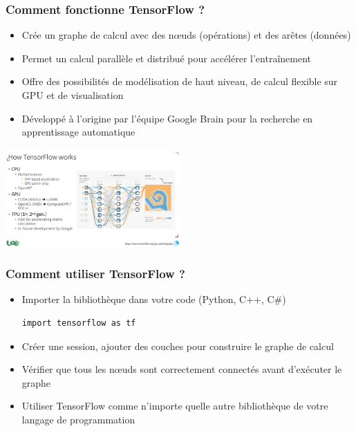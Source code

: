 \documentclass{beamer}
\begin{document}
	\begin{frame}
		\frametitle{Comment fonctionne TensorFlow ?}
		\begin{itemize}
			\item Crée un graphe de calcul avec des nœuds (opérations) et des arêtes (données)
			\item Permet un calcul parallèle et distribué pour accélérer l'entraînement
			\item Offre des possibilités de modélisation de haut niveau, de calcul flexible sur GPU et de visualisation
			\item Développé à l'origine par l'équipe Google Brain pour la recherche en apprentissage automatique
		\end{itemize}

			\centering
	\includegraphics[width=0.5\textwidth]{Tensorflow work.jpeg}
	\end{frame}
	
	\begin{frame}[fragile]
		\frametitle{Comment utiliser TensorFlow ?}
		\begin{itemize}
			\item Importer la bibliothèque dans votre code (Python, C++, C\#)
\begin{lstlisting}
import tensorflow as tf
\end{lstlisting}	
			\item Créer une session, ajouter des couches pour construire le graphe de calcul
			\item Vérifier que tous les nœuds sont correctement connectés avant d'exécuter le graphe
			\item Utiliser TensorFlow comme n'importe quelle autre bibliothèque de votre langage de programmation
		\end{itemize}
	\end{frame}
	
\end{document}
